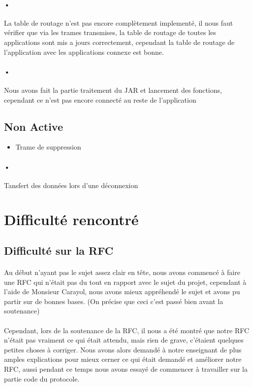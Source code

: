 \documentclass[a4paper,titlepage]{report}
\begin{document}
\paragraph{•} La table de routage n'est pas encore complètement implementé, il nous faut vérifier que via les trames transmises, la table de routage de toutes les applications sont mis a jours correctement, cependant la table de routage de l'application avec les applications connexe est bonne.
\paragraph{•} Nous avons fait la partie traitement du JAR et lancement des fonctions, cependant ce n'est pas encore connecté au reste de l'application
\subsection{Non Active}
\begin{itemize}
\item Trame de suppression
\end{itemize}
\paragraph{•} Tansfert des données lors d'une déconnexion




\pagebreak
\section{Difficulté rencontré}
\subsection{Difficulté sur la RFC}
\paragraph{}
Au début n'ayant pas le sujet assez clair en tête, nous avons commencé à faire une RFC qui n'était pas du tout en rapport avec le sujet du projet, cependant à l'aide de Monsieur Carayol, nous avons mieux appréhendé le sujet et avons pu partir sur de bonnes bases. (On précise que ceci c'est passé bien avant la soutenance)
\paragraph{}
Cependant, lors de la soutenance de la RFC, il nous a été montré que notre RFC n'était pas vraiment ce qui était attendu, mais rien de grave, c'étaient quelques petites choses à corriger.
Nous avons alors demandé à notre enseignant de plus amples explications pour mieux cerner ce qui était demandé et améliorer notre RFC, aussi pendant ce temps nous avons essayé de commencer à travailler sur la partie code du protocole.
\end{document}
